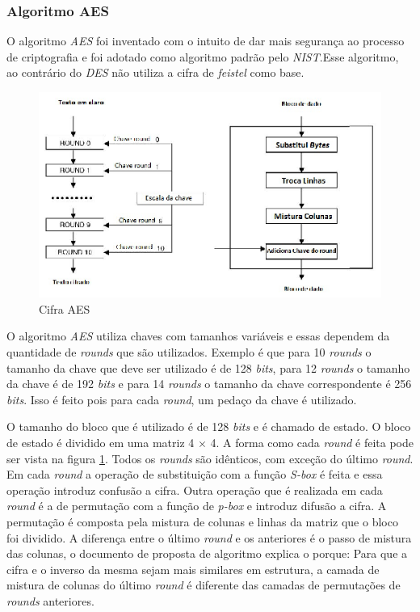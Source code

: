 \subsubsection{Algoritmo AES}

O algoritmo \textit{AES} foi inventado com o intuito de dar mais segurança ao processo de criptografia e foi adotado como algoritmo padrão pelo \textit{NIST}.Esse algoritmo, ao contrário do \textit{DES} não utiliza a cifra de \textit{feistel} como base. 

\begin{figure}[h]
	\centering
	\includegraphics[scale=2]
		{figuras/aes_cipher.eps}
		\caption[Cifra\textit{AES}]{Cifra AES\protect\footnotemark} 
		\label{cifra-aes}
\end{figure}


O algoritmo \textit{AES} utiliza chaves com tamanhos variáveis e essas dependem da quantidade de \textit{rounds} que são utilizados. Exemplo é que para 10 \textit{rounds} o tamanho da chave que deve ser utilizado é de 128 \textit{bits}, para 12 \textit{rounds} o tamanho da chave é de 192 \textit{bits} e para 14 \textit{rounds} o tamanho da chave correspondente é 256 \textit{bits}. Isso é feito pois para cada \textit{round}, um pedaço da chave é utilizado.

O tamanho do bloco que é utilizado é de 128 \textit{bits} e é chamado de estado. O bloco de estado é dividido em uma matriz 4 $\times$ 4. A forma como cada \textit{round} é feita pode ser vista na figura \ref{cifra-aes}. Todos os \textit{rounds} são idênticos, com exceção do último \textit{round}. Em cada \textit{round} a operação de substituição com a função \textit{S-box} é feita e essa operação introduz confusão a cifra. Outra operação que é realizada em cada \textit{round} é a de permutação com a função de \textit{p-box} e introduz difusão a cifra. A permutação é composta pela mistura de colunas e linhas da matriz que o bloco foi dividido. A diferença entre o último \textit{round} e os anteriores é o passo de mistura das colunas, o documento de proposta de algoritmo explica o porque: Para que a cifra e o inverso da mesma sejam mais similares em estrutura, a camada de mistura de colunas do último \textit{round} é diferente das camadas de permutações de \textit{rounds} anteriores.\cite{aes-proposal}

